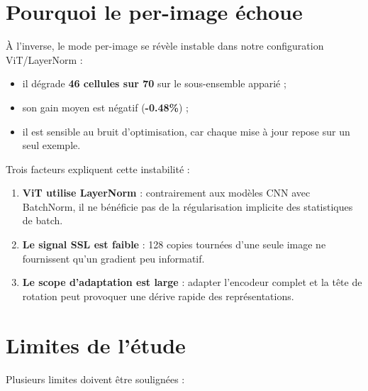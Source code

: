 \documentclass[12pt,a4paper]{report}
\begin{document}
	\section{Pourquoi le per-image échoue}
	À l’inverse, le mode per-image se révèle instable dans notre configuration ViT/LayerNorm :
	\begin{itemize}
		\item il dégrade \textbf{46 cellules sur 70} sur le sous-ensemble apparié ;
		\item son gain moyen est négatif (\textbf{-0.48\%}) ;
		\item il est sensible au bruit d’optimisation, car chaque mise à jour repose sur un seul exemple.
	\end{itemize}
	
	Trois facteurs expliquent cette instabilité :
	\begin{enumerate}
		\item \textbf{ViT utilise LayerNorm} : contrairement aux modèles CNN avec BatchNorm, il ne bénéficie pas de la régularisation implicite des statistiques de batch.
		\item \textbf{Le signal SSL est faible} : 128 copies tournées d’une seule image ne fournissent qu’un gradient peu informatif.
		\item \textbf{Le scope d’adaptation est large} : adapter l’encodeur complet et la tête de rotation peut provoquer une dérive rapide des représentations.
	\end{enumerate}
	
	\section{Limites de l’étude}
	Plusieurs limites doivent être soulignées :
	
\end{document}
